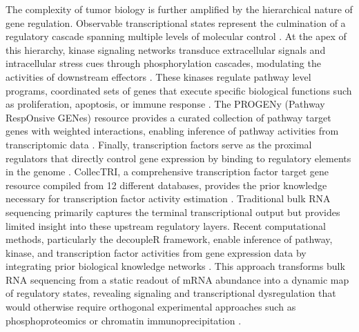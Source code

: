 \documentclass[pdflatex,article,12pt]{article}
\begin{document}
The complexity of tumor biology is further amplified by the hierarchical nature of gene regulation. Observable transcriptional states represent the culmination of a regulatory cascade spanning multiple levels of molecular control \cite{lachmann2010mara,alvarez2016functional}. At the apex of this hierarchy, kinase signaling networks transduce extracellular signals and intracellular stress cues through phosphorylation cascades, modulating the activities of downstream effectors \cite{schoeberl2009computational,schubert2018perturbation}. These kinases regulate pathway level programs, coordinated sets of genes that execute specific biological functions such as proliferation, apoptosis, or immune response \cite{schubert2018perturbation,holland2019robustness}. The PROGENy (Pathway RespOnsive GENes) resource provides a curated collection of pathway target genes with weighted interactions, enabling inference of pathway activities from transcriptomic data \cite{schubert2018perturbation,holland2020transfer}. Finally, transcription factors serve as the proximal regulators that directly control gene expression by binding to regulatory elements in the genome \cite{lambert2018human,castro2016regulons}. CollecTRI, a comprehensive transcription factor target gene resource compiled from 12 different databases, provides the prior knowledge necessary for transcription factor activity estimation \cite{garcia2023benchmark,badia2022decoupler}. Traditional bulk RNA sequencing primarily captures the terminal transcriptional output but provides limited insight into these upstream regulatory layers. Recent computational methods, particularly the decoupleR framework, enable inference of pathway, kinase, and transcription factor activities from gene expression data by integrating prior biological knowledge networks \cite{badia2022decoupler}. This approach transforms bulk RNA sequencing from a static readout of mRNA abundance into a dynamic map of regulatory states, revealing signaling and transcriptional dysregulation that would otherwise require orthogonal experimental approaches such as phosphoproteomics or chromatin immunoprecipitation \cite{badia2022decoupler,garcia2023benchmark}.
\end{document}
